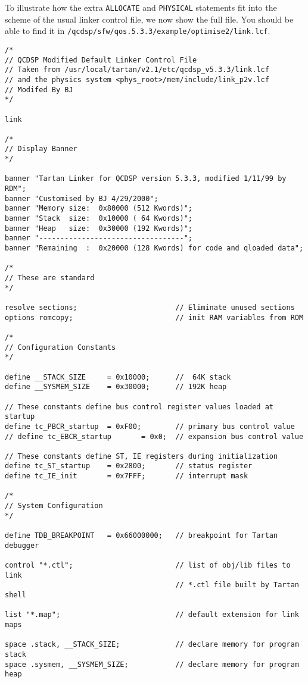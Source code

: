 To illustrate how the extra {\tt ALLOCATE} and {\tt PHYSICAL} statements
fit into the scheme of the usual linker control file, we now show the 
full file. You should be able to find it in {\tt /qcdsp/sfw/qos.5.3.3/example/optimise2/link.lcf}.
{\scriptsize
\begin{verbatim}
/*
// QCDSP Modified Default Linker Control File
// Taken from /usr/local/tartan/v2.1/etc/qcdsp_v5.3.3/link.lcf 
// and the physics system <phys_root>/mem/include/link_p2v.lcf
// Modifed By BJ
*/

link  

/*
// Display Banner
*/

banner "Tartan Linker for QCDSP version 5.3.3, modified 1/11/99 by RDM";
banner "Customised by BJ 4/29/2000";
banner "Memory size:  0x80000 (512 Kwords)";
banner "Stack  size:  0x10000 ( 64 Kwords)";
banner "Heap   size:  0x30000 (192 Kwords)";
banner "----------------------------------";
banner "Remaining  :  0x20000 (128 Kwords) for code and qloaded data";

/*
// These are standard
*/

resolve sections;                       // Eliminate unused sections
options romcopy;                        // init RAM variables from ROM

/*
// Configuration Constants
*/

define __STACK_SIZE     = 0x10000;      //  64K stack
define __SYSMEM_SIZE    = 0x30000;      // 192K heap

// These constants define bus control register values loaded at startup
define tc_PBCR_startup  = 0xF00;        // primary bus control value
// define tc_EBCR_startup       = 0x0;  // expansion bus control value

// These constants define ST, IE registers during initialization
define tc_ST_startup    = 0x2800;       // status register
define tc_IE_init       = 0x7FFF;       // interrupt mask
 
/*
// System Configuration
*/

define TDB_BREAKPOINT   = 0x66000000;   // breakpoint for Tartan debugger

control "*.ctl";                        // list of obj/lib files to link
                                        // *.ctl file built by Tartan shell

list "*.map";                           // default extension for link maps

space .stack, __STACK_SIZE;             // declare memory for program stack
space .sysmem, __SYSMEM_SIZE;           // declare memory for program heap


\end{verbatim}}
